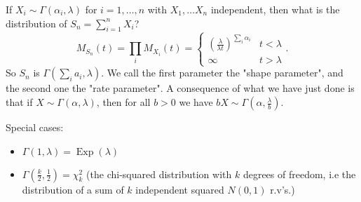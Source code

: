 \documentclass[a4paper]{scrartcl}
\begin{document}
\begin{example*}
     If $X_{i} \sim \Gamma (\alpha_{i}, \lambda)$ for $i=1,\ldots ,n$ with $X_1 , \ldots X_n$ independent, then what is the distribution of $S_{n}=\sum_{i=1}^{n}X_{i}$? \[
          M_{S_{n}}(t)=\prod_{i}M_{X_{i}}(t)=
          \begin{cases}
              \left(\frac{\lambda}{\lambda t}\right)^{\sum_{i}^{}\alpha_{i}} & t<\lambda\\
              \infty & t>\lambda
          \end{cases}
          .\]  
          So $S_{n}$ is $\Gamma (\sum_{i}^{}a_{i}, \lambda)$. We call the first parameter the "shape parameter", and the second one the "rate parameter". A consequence of what we have just done is that if $X \sim \Gamma (\alpha, \lambda)$, then for all $b>0$ we have $bX \sim \Gamma (\alpha, \frac{\lambda}{b})$. 
          
          Special cases: 
          \begin{itemize}
              \item $\Gamma (1, \lambda)=\operatorname{Exp}(\lambda)$ 
              \item $\Gamma \left(\frac{k}{2},\frac{1}{2}\right)=\chi_k^2$ (the chi-squared distribution with $k$ degrees of freedom, i.e the distribution of a sum of $k$ independent squared $N (0,1)$ r.v's.)
          \end{itemize}
\end{example*}
\end{document}
